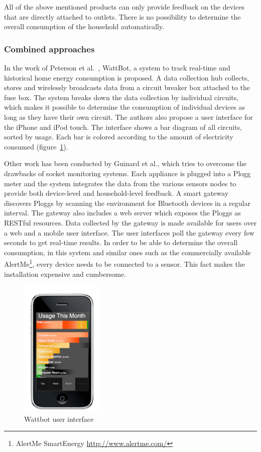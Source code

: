 All of the above mentioned products can only provide feedback on the devices that are directly attached to outlets. There is no possibility to determine the overall consumption of the household automatically. 
\subsubsection{Combined approaches}
In the work of Peterson et al.~\cite{Petersen_2009}, WattBot, a system to track real-time and historical home energy consumption is proposed.  
A data collection hub collects, stores and wirelessly broadcasts data from a circuit breaker box attached to the fuse box. The system breaks down the data collection by individual circuits, which makes it possible to determine the consumption of individual devices as long as they have their own circuit. The authors also propose a user interface for the iPhone and iPod touch. The interface shows a bar diagram of all circuits, sorted by usage. Each bar is colored according to the amount of electricity consumed (figure~\ref{wattbot}).

Other work has been conducted by Guinard et al.\cite{weiss:inprocMUM:2010}, which tries to overcome the drawbacks of socket monitoring systems. Each appliance is plugged into a Plogg meter and the system integrates the data from the various sensors nodes to provide both device-level and household-level feedback. A smart gateway discovers Ploggs by scanning the environment for Bluetooth devices in a regular interval. The gateway also includes a web server which exposes the Ploggs as RESTful resources. Data collected by the gateway is made available for users over a web and a mobile user interface. The user interfaces poll the gateway every few seconds to get real-time results.   	
In order to be able to determine the overall consumption, in this system and similar ones such as the commercially available AlertMe\footnote{AlertMe SmartEnergy \url{http://www.alertme.com/}}, every device needs to be connected to a sensor. This fact makes the installation expensive and cumbersome. 

\begin{figure}[htbp]
\begin{center}
\includegraphics[width=4cm]{Images/wattbot.jpg}
\caption{Wattbot user interface}
\label{wattbot}
\end{center}
\end{figure} 
 

